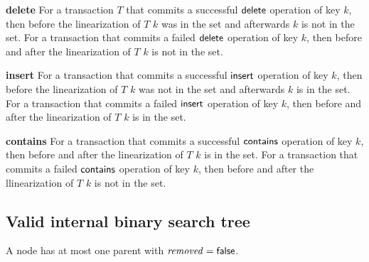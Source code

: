 % 

{\bf delete} For a transaction $T$ that commits a successful $\act{delete}$ operation of key $k$, then before the linearization of $T$ $k$ was in the set
and afterwards $k$ is not in the set.
For a transaction that commits a failed $\act{delete}$ operation of key $k$, then before and after the linearization of $T$ $k$ is not in the set.

{\bf insert} For a transaction that commits a successful $\act{insert}$ operation of key $k$, then before the linearization of $T$ $k$ was not in the set and afterwards $k$ is in the set.
For a transaction that commits a failed $\act{insert}$ operation of key $k$, then before and after the linearization of $T$ $k$ is in the set.

{\bf contains} For a transaction that commits a successful $\act{contains}$ operation of key $k$, then before and after the linearization of $T$ $k$ is in the set.
For a transaction that commits a failed $\act{contains}$ operation of key $k$, then before and after the llinearization of $T$ $k$ is not in the set.




\subsection{Valid internal binary search tree}





\begin{lemma}
\label{lemma:1-rem}
A node has at most one parent with $\ms{removed} = \lit{false}$.
\end{lemma}


